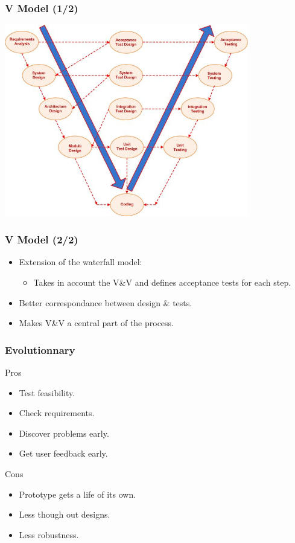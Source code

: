 \documentclass[10pt]{beamer}
\begin{document}
\begin{frame}[fragile]
  \frametitle{V Model (1/2)}
  \begin{center}
    \includegraphics[width=0.8\textwidth]{V-model}
  \end{center}
\end{frame}
\begin{frame}[fragile]
  \frametitle{V Model (2/2)}
  \begin{exampleblock}{}
    \begin{itemize}
    \item Extension of the waterfall model:
      \begin{itemize}
      \item Takes in account the V\&V and defines acceptance tests for each step.
      \end{itemize}
    \item Better correspondance between design \& tests.
    \item Makes V\&V a central part of the process.
    \end{itemize}
  \end{exampleblock}
\end{frame}


\begin{frame}[fragile]
  \frametitle{Evolutionnary}
  \begin{exampleblock}{Pros}
    \begin{itemize}
    \item Test feasibility.
    \item Check requirements.
    \item Discover problems early.
    \item Get user feedback early.
    \end{itemize}
  \end{exampleblock}
  \begin{alertblock}{Cons}
    \begin{itemize}
    \item Prototype gets a life of its own.
    \item Less though out designs.
    \item Less robustness.
    \end{itemize}
  \end{alertblock}
\end{frame}
\end{document}
